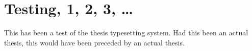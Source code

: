 \documentclass[phd, print]{nuthesis}
\begin{document}
\backmatter

\appendix

\chapter{Testing, 1, 2, 3, \ldots}

This has been a test of the thesis typesetting system.
Had this been an actual thesis, this would have been
preceded by an actual thesis.



\nocite{*}

\end{document}
